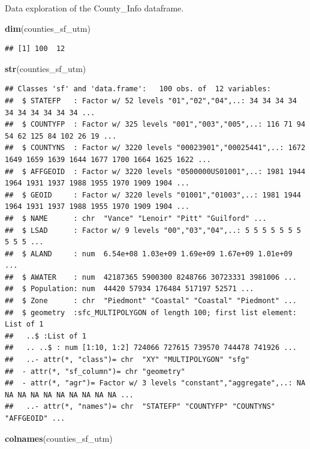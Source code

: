 \documentclass[12pt,]{article}
\newenvironment{Shaded}{\begin{snugshade}}{\end{snugshade}}
\newcommand{\KeywordTok}[1]{\textcolor[rgb]{0.13,0.29,0.53}{\textbf{#1}}}
\newcommand{\NormalTok}[1]{#1}
\begin{document}
Data exploration of the County\_Info dataframe.

\begin{Shaded}
\begin{Highlighting}[]
\KeywordTok{dim}\NormalTok{(counties_sf_utm)}
\end{Highlighting}
\end{Shaded}

\begin{verbatim}
## [1] 100  12
\end{verbatim}

\begin{Shaded}
\begin{Highlighting}[]
\KeywordTok{str}\NormalTok{(counties_sf_utm)}
\end{Highlighting}
\end{Shaded}

\begin{verbatim}
## Classes 'sf' and 'data.frame':   100 obs. of  12 variables:
##  $ STATEFP   : Factor w/ 52 levels "01","02","04",..: 34 34 34 34 34 34 34 34 34 34 ...
##  $ COUNTYFP  : Factor w/ 325 levels "001","003","005",..: 116 71 94 54 62 125 84 102 26 19 ...
##  $ COUNTYNS  : Factor w/ 3220 levels "00023901","00025441",..: 1672 1649 1659 1639 1644 1677 1700 1664 1625 1622 ...
##  $ AFFGEOID  : Factor w/ 3220 levels "0500000US01001",..: 1981 1944 1964 1931 1937 1988 1955 1970 1909 1904 ...
##  $ GEOID     : Factor w/ 3220 levels "01001","01003",..: 1981 1944 1964 1931 1937 1988 1955 1970 1909 1904 ...
##  $ NAME      : chr  "Vance" "Lenoir" "Pitt" "Guilford" ...
##  $ LSAD      : Factor w/ 9 levels "00","03","04",..: 5 5 5 5 5 5 5 5 5 5 ...
##  $ ALAND     : num  6.54e+08 1.03e+09 1.69e+09 1.67e+09 1.01e+09 ...
##  $ AWATER    : num  42187365 5900300 8248766 30723331 3981006 ...
##  $ Population: num  44420 57934 176484 517197 52571 ...
##  $ Zone      : chr  "Piedmont" "Coastal" "Coastal" "Piedmont" ...
##  $ geometry  :sfc_MULTIPOLYGON of length 100; first list element: List of 1
##   ..$ :List of 1
##   .. ..$ : num [1:10, 1:2] 724066 727615 739570 744478 741926 ...
##   ..- attr(*, "class")= chr  "XY" "MULTIPOLYGON" "sfg"
##  - attr(*, "sf_column")= chr "geometry"
##  - attr(*, "agr")= Factor w/ 3 levels "constant","aggregate",..: NA NA NA NA NA NA NA NA NA NA ...
##   ..- attr(*, "names")= chr  "STATEFP" "COUNTYFP" "COUNTYNS" "AFFGEOID" ...
\end{verbatim}

\begin{Shaded}
\begin{Highlighting}[]
\KeywordTok{colnames}\NormalTok{(counties_sf_utm)}
\end{Highlighting}
\end{Shaded}
\end{document}
